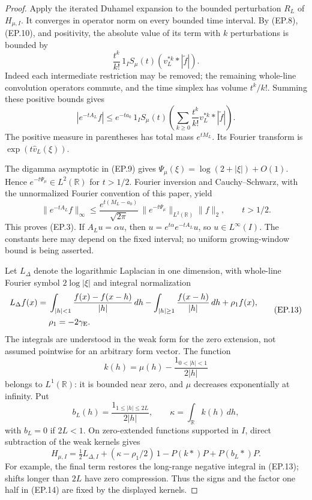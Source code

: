 \begin{proof}
Apply the iterated Duhamel expansion to the bounded
perturbation \(R_L\) of \(H_{\mu,I}\).  It converges in
operator norm on every bounded time interval.
By (EP.8), (EP.10), and positivity, the absolute value
of its term with \(k\) perturbations is bounded by
\[
 \frac{t^k}{k!}\,1_I
                 S_\mu(t)(v_L^{*k}*|\widetilde f|).
\]
Indeed each intermediate restriction may be removed;
the remaining whole-line convolution operators commute,
and the time simplex has volume \(t^k/k!\).
Summing these positive bounds gives
\[
 |e^{-tA_L}f|
     \leq e^{-ta_0}\,1_I S_\mu(t)
                  \left(\sum_{k\geq0}
                         \frac{t^k}{k!}v_L^{*k}
                         *|\widetilde f|\right).
                                                        \tag{EP.11}
\]
The positive measure in parentheses has total mass
\(e^{tM_L}\).  Its Fourier transform is
\(\exp(t\widehat v_L(\xi))\).

The digamma asymptotic in (EP.9) gives
\(\Psi_\mu(\xi)=\log(2+|\xi|)+O(1)\).
Hence \(e^{-t\Psi_\mu}\in L^2(\mathbb R)\) for \(t>1/2\).
Fourier inversion and Cauchy--Schwarz, with the
unnormalized Fourier convention of this paper, yield
\[
 \|e^{-tA_L}f\|_\infty
 \leq \frac{e^{t(M_L-a_0)}}{\sqrt{2\pi}}\,
          \|e^{-t\Psi_\mu}\|_{L^2(\mathbb R)}\|f\|_2,
                  \qquad t>1/2.                       \tag{EP.12}
\]
This proves (EP.3).  If \(A_Lu=\alpha u\), then
\(u=e^{t\alpha}e^{-tA_L}u\), so \(u\in L^\infty(I)\).
The constants here may depend on the fixed interval;
no uniform growing-window bound is being asserted.

Let \(L_\Delta\) denote the logarithmic Laplacian in
one dimension, with whole-line Fourier symbol
\(2\log|\xi|\) and integral normalization
\[
 \begin{split}
 L_\Delta f(x)={}&
   \int_{|h|<1}\frac{f(x)-f(x-h)}{|h|}\,dh
       -\int_{|h|\geq1}\frac{f(x-h)}{|h|}\,dh
       +\rho_1f(x),\\
 &\rho_1=-2\gamma_{\rm E}.
 \end{split}                                           \tag{EP.13}
\]
The integrals are understood in the weak form for the
zero extension, not assumed pointwise for an arbitrary
form vector.
The function
\[
 k(h)=\mu(h)-\frac{1_{0<|h|<1}}{2|h|}
\]
belongs to \(L^1(\mathbb R)\):
it is bounded near zero, and \(\mu\) decreases
exponentially at infinity.  Put
\[
 b_L(h)=\frac{1_{1\leq|h|\leq2L}}{2|h|},
 \qquad \kappa=\int_{\mathbb R}k(h)\,dh,
\]
with \(b_L=0\) if \(2L<1\).
On zero-extended functions supported in \(I\), direct
subtraction of the weak kernels gives
\[
 H_{\mu,I}
   =\tfrac12 L_{\Delta,I}
        +(\kappa-\rho_1/2)\,1
           -P(k*)P+P(b_L*)P.                          \tag{EP.14}
\]
For example, the final term restores the long-range
negative integral in (EP.13); shifts longer than \(2L\)
have zero compression.  Thus the signs and the factor
one half in (EP.14) are fixed by the displayed kernels.


\end{proof}
